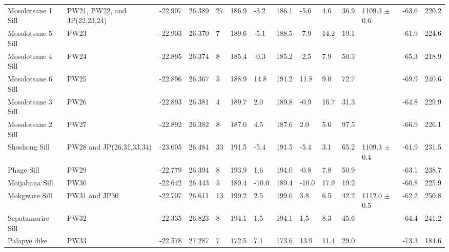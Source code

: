 \documentclass[11pt,letterpaper]{article}
\begin{document}
\begin{table}[!ht]
\begin{adjustwidth}{-0.0in}{0in}
\begin{tiny}
\begin{tabular}{p{2.0 cm}p{1.25 cm}llllllllllll}
Mosolotsane 1 Sill       &  PW21, PW22, and JP(22,23,24) &   -22.907 &     26.389 &   27 &  186.9 &  -3.2 &   186.1 &    -5.6 &   4.6 &   36.9 &  1109.3  $\pm$ 0.6 &     -63.6 &      220.2 \\
Mosolotsane 5 Sill       &                             PW23 &   -22.903 &     26.370 &    7 &  189.6 &  -5.1 &   188.5 &    -7.9 &  14.2 &   19.1 &      &     -61.9 &      224.6 \\
Mosolotsane 4 Sill       &                              PW24 &   -22.895 &     26.374 &    8 &  185.4 &  -0.3 &   185.2 &    -2.5 &   7.9 &   50.3 &      &     -65.3 &      218.9 \\
Mosolotsane 6 Sill       &                              PW25 &   -22.896 &     26.367 &    5 &  188.9 &  14.8 &   191.2 &    11.8 &   9.0 &   72.7 &      &     -69.9 &      240.6 \\
Mosolotsane 3 Sill       &                              PW26 &   -22.893 &     26.381 &    4 &  189.7 &   2.0 &   189.8 &    -0.9 &  16.7 &   31.3 &      &     -64.8 &      229.9 \\
Mosolotsane 2 Sill       &                              PW27 &   -22.892 &     26.382 &    8 &  187.0 &   4.5 &   187.6 &     2.0 &   5.6 &   97.5 &      &     -66.9 &      226.1 \\
Shoshong Sill            &          PW28 and JP(26,31,33,34) &   -23.005 &     26.484 &   33 &  191.5 &  -5.4 &   191.5 &    -5.4 &   3.1 &   65.2 &  1109.3  $\pm$ 0.4 &     -61.9 &      231.5 \\
Phage Sill               &                              PW29 &   -22.779 &     26.394 &    8 &  193.9 &   1.6 &   194.0 &    -0.8 &   7.8 &   50.9 &      &     -63.1 &      238.7 \\
Moijabana Sill           &                              PW30 &   -22.642 &     26.443 &    5 &  189.4 & -10.0 &   189.4 &   -10.0 &  17.9 &   19.2 &      &     -60.8 &      225.9 \\
Mokgware Sill            &                    PW31 and JP30 &   -22.707 &     26.611 &   13 &  199.2 &   2.5 &   199.0 &     3.8 &   6.5 &   42.2 &  1112.0  $\pm$ 0.5 &     -62.2 &      250.8 \\
Sepatamorire Sill        &                             PW32 &   -22.335 &     26.823 &    8 &  194.1 &   1.5 &   194.1 &     1.5 &   8.3 &   45.6 &      &     -64.4 &      241.2 \\
Palapye dike             &                              PW33 &   -22.578 &     27.287 &    7 &  172.5 &   7.1 &   173.6 &    13.9 &  11.4 &   29.0 &      &     -73.3 &      184.6 \\

\end{tabular}
\end{tiny}
\end{adjustwidth}
\end{table}
\end{document}
